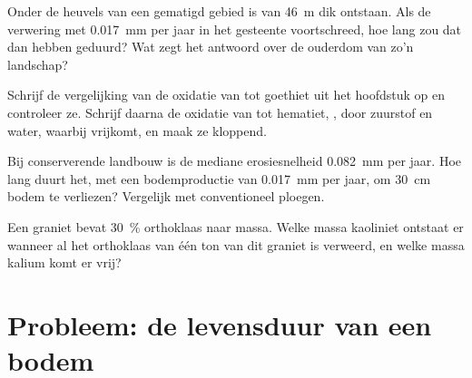 \begin{exercise}[$\star\star\star$]\label{exo:g10:soil-formation:12}
Onder de heuvels van een gematigd gebied is  van \qty{46}{m} dik
ontstaan. Als de verwering met \qty{0.017}{mm} per jaar in het gesteente
voortschreed, hoe lang zou dat dan hebben geduurd? Wat zegt het antwoord over de
ouderdom van zo'n landschap?
\end{exercise}

\begin{exercise}[$\star\star\star$]\label{exo:g10:soil-formation:13}
Schrijf de vergelijking van de oxidatie van  tot goethiet uit het
hoofdstuk op en controleer ze. Schrijf daarna de oxidatie van  tot
hematiet, , door zuurstof en water, waarbij  vrijkomt, en maak ze kloppend.
\end{exercise}

\begin{exercise}[$\star\star\star$]\label{exo:g10:soil-formation:14}
Bij conserverende landbouw is de mediane erosiesnelheid \qty{0.082}{mm} per
jaar. Hoe lang duurt het, met een bodemproductie van \qty{0.017}{mm} per jaar,
om \qty{30}{cm} bodem te verliezen? Vergelijk met conventioneel ploegen.
\end{exercise}

\begin{exercise}[$\star\star\star$]\label{exo:g10:soil-formation:15}
Een graniet bevat \qty{30}{\percent} orthoklaas naar massa. Welke massa kaoliniet
ontstaat er wanneer al het orthoklaas van één ton van dit graniet is verweerd, en
welke massa kalium komt er vrij?
\end{exercise}

\section{Probleem: de levensduur van een bodem}


